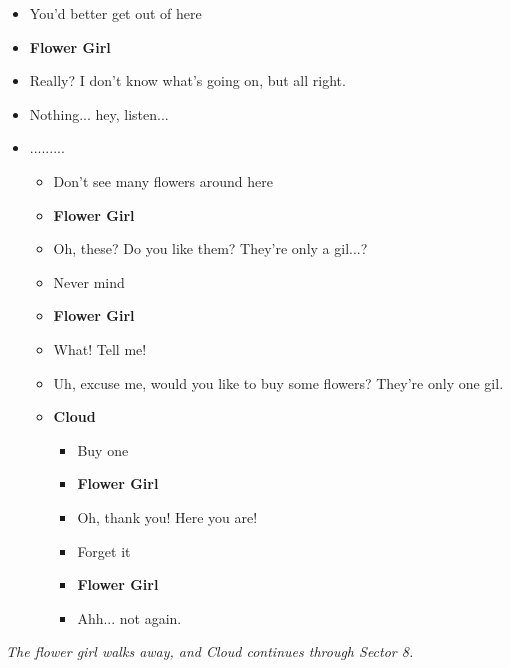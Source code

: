 \documentclass[10pt]{book}
\newcommand{\leaveSpace}{\vspace{0.0625in}}
\newcommand{\stageDirection}[1]{{\centering \textcolor{benred8}{\textit{#1}} \par} \leaveSpace}
\newenvironment{paracolSection}
    {\begin{paracol}{2}
    \selectlanguage{japanese}
    }
    {
    \end{paracol}
    \leaveSpace
    }
\newcommand{\CloudEng}{Cloud}
\newcommand{\flowerGirlEng}{Flower Girl}
\newcommand{\role}[1]{\noindent \textbf{#1}}
\newcommand{\roleCloudEng}{\role{\CloudEng}}
\newcommand{\roleFlowerGirlEng}{\role{\flowerGirlEng}}
\begin{document}
\begin{paracolSection}
\begin{itemize}
    \item You'd better get out of here
    \item[] \roleFlowerGirlEng
    \item[] Really? I don't know what's going on, but all right.
    \item Nothing... hey, listen...
    \item[] .........
    \begin{itemize}
        \item Don't see many flowers around here
        \item[] \roleFlowerGirlEng
        \item[] Oh, these? Do you like them? They're only a gil...?
        \item Never mind
        \item[] \roleFlowerGirlEng
        \item[] What! Tell me!
        \item[] Uh, excuse me, would you like to buy some flowers? They're only one gil.
        \item[] \roleCloudEng
        \begin{itemize}
            \item Buy one
            \item[] \roleFlowerGirlEng
            \item[] Oh, thank you! Here you are!
            \item Forget it
            \item[] \roleFlowerGirlEng
            \item[] Ahh... not again.
        \end{itemize}
    \end{itemize}
\end{itemize}

\end{paracolSection}

\stageDirection{The flower girl walks away, and Cloud continues through Sector 8.}

%
%
%
\end{document}
